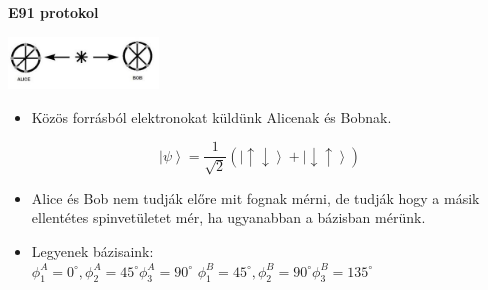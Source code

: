 \documentclass{beamer}
\begin{document}
    \begin{frame}

        \center

        \textbf{E91 protokol}

        \includegraphics[width=0.3\textwidth]{e91source.jpg}

        \begin{itemize}
            \item Közös forrásból elektronokat küldünk Alicenak és Bobnak.
        \end{itemize}

        \begin{equation}
            \left| \psi \right\rangle =
            \frac{1}{\sqrt{2}} \left(
            \left| \uparrow \downarrow \right\rangle + \left| \downarrow \uparrow \right\rangle
            \right)
        \end{equation}

        \begin{itemize}
            \item Alice és Bob nem tudják előre mit fognak mérni, de tudják hogy a másik ellentétes spinvetületet mér, ha ugyanabban a bázisban mérünk.
            \item Legyenek bázisaink:\\
                $\phi^A_1 = 0 ^{\circ}, \phi^A_2 = 45 ^{\circ}\phi^A_3 = 90 ^{\circ}$
                $\phi^B_1 = 45 ^{\circ}, \phi^B_2 = 90 ^{\circ}\phi^B_3 = 135 ^{\circ}$
        \end{itemize}

    \end{frame}
\end{document}

